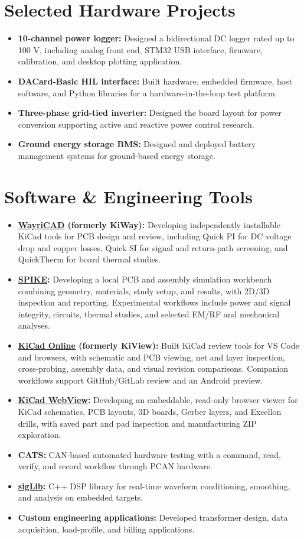 \documentclass[11pt, a4paper]{article}
\newcommand{\projectItem}[2]{
    \item \textbf{\color{primary}#1:} \small{#2}
}
\begin{document}
\newpage
\section*{Selected Hardware Projects}
\begin{itemize}[leftmargin=1.5em, itemsep=2pt, topsep=0pt]
    \projectItem{10-channel power logger}{Designed a bidirectional DC logger rated up to 100 V, including analog front end, STM32 USB interface, firmware, calibration, and desktop plotting application.}
    \projectItem{DACard-Basic HIL interface}{Built hardware, embedded firmware, host software, and Python libraries for a hardware-in-the-loop test platform.}
    \projectItem{Three-phase grid-tied inverter}{Designed the board layout for power conversion supporting active and reactive power control research.}
    \projectItem{Ground energy storage BMS}{Designed and deployed battery management systems for ground-based energy storage.}
\end{itemize}

\section*{Software \& Engineering Tools}
\begin{itemize}[leftmargin=1.5em, itemsep=2pt, topsep=0pt]
    \projectItem{\href{https://github.com/wayri/WayriCAD}{WayriCAD} (formerly KiWay)}{Developing independently installable KiCad tools for PCB design and review, including Quick PI for DC voltage drop and copper losses, Quick SI for signal and return-path screening, and QuickTherm for board thermal studies.}
    \projectItem{\href{https://github.com/wayri/SPIKE}{SPIKE}}{Developing a local PCB and assembly simulation workbench combining geometry, materials, study setup, and results, with 2D/3D inspection and reporting. Experimental workflows include power and signal integrity, circuits, thermal studies, and selected EM/RF and mechanical analyses.}
    \projectItem{\href{https://github.com/wayri/KiCad-Online}{KiCad Online} (formerly KiView)}{Built KiCad review tools for VS Code and browsers, with schematic and PCB viewing, net and layer inspection, cross-probing, assembly data, and visual revision comparisons. Companion workflows support GitHub/GitLab review and an Android preview.}
    \projectItem{\href{https://wayri.github.io/kicad-webview/}{KiCad WebView}}{Developing an embeddable, read-only browser viewer for KiCad schematics, PCB layouts, 3D boards, Gerber layers, and Excellon drills, with saved part and pad inspection and manufacturing ZIP exploration.}
    \projectItem{CATS}{CAN-based automated hardware testing with a command, read, verify, and record workflow through PCAN hardware.}
    \projectItem{\href{https://github.com/wayri/sigLib}{sigLib}}{C++ DSP library for real-time waveform conditioning, smoothing, and analysis on embedded targets.}
    \projectItem{Custom engineering applications}{Developed transformer design, data acquisition, load-profile, and billing applications.}
\end{itemize}
\end{document}
